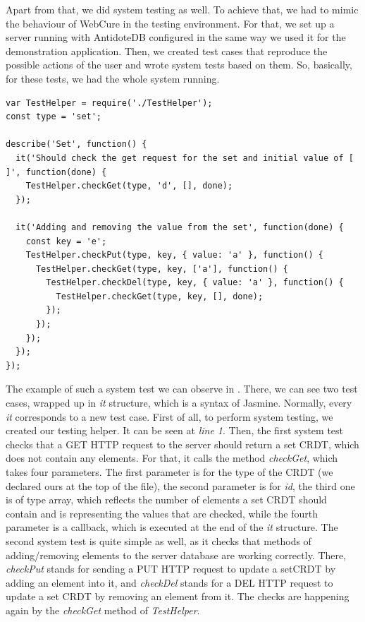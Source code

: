 Apart from that, we did system testing as well. To achieve that, we had to mimic the behaviour of WebCure in the testing environment. For that, we set up a server running with AntidoteDB configured in the same way we used it for the demonstration application. Then, we created test cases that reproduce the possible actions of the user and wrote system tests based on them. So, basically, for these tests, we had the whole system running. 

\begin{lstlisting}[caption={[System test example for WebCure] Simple system test that checks different actions performed on \textit{SetCRDT}.}, label={lst:ev2}]
var TestHelper = require('./TestHelper');
const type = 'set';

describe('Set', function() {
  it('Should check the get request for the set and initial value of [ ]', function(done) {
    TestHelper.checkGet(type, 'd', [], done);
  });

  it('Adding and removing the value from the set', function(done) {
    const key = 'e';
    TestHelper.checkPut(type, key, { value: 'a' }, function() {
      TestHelper.checkGet(type, key, ['a'], function() {
        TestHelper.checkDel(type, key, { value: 'a' }, function() {
          TestHelper.checkGet(type, key, [], done);
        });
      });
    });
  });
});
\end{lstlisting}

The example of such a system test we can observe in . There, we can see two test cases, wrapped up in \textit{it} structure, which is a syntax of Jasmine. Normally, every \textit{it} corresponds to a new test case. First of all, to perform system testing, we created our testing helper. It can be seen at \textit{line 1}. Then, the first system test checks that a GET HTTP request to the server should return a set CRDT, which does not contain any elements. For that, it calls the method \textit{checkGet}, which takes four parameters. The first parameter is for the type of the CRDT (we declared ours at the top of the file), the second parameter is for \textit{id}, the third one is of type array, which reflects the number of elements a set CRDT should contain and is representing the values that are checked, while the fourth parameter is a callback, which is executed at the end of the \textit{it} structure. The second system test is quite simple as well, as it checks that methods of adding/removing elements to the server database are working correctly. There, \textit{checkPut} stands for sending a PUT HTTP request to update a setCRDT by adding an element into it, and \textit{checkDel} stands for a DEL HTTP request to update a set CRDT by removing an element from it. The checks are happening again by the \textit{checkGet} method of \textit{TestHelper}.

